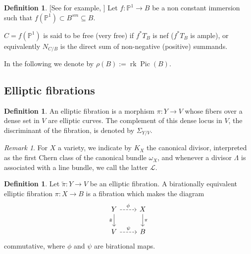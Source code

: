 \documentclass[11pt]{amsart}
\theoremstyle{definition}
\newtheorem{definition}[theorem]{Definition}
\theoremstyle{definition}
\theoremstyle{remark}
\newtheorem{remark}[theorem]{Remark}
\theoremstyle{remark}
\theoremstyle{definition}
\theoremstyle{conjecture}
\def\PP{{\mathbb P}}
\begin{document}
 \begin{definition}\label{def:freeVerFree}[See for example, \cite[Section 2.4]{Debarre2011GAEL}] Let $f: \PP^1\to B$ be a non constant immersion such that $f(\PP^1) \subset B^{sm} \subseteq B$. 
 
 $C=f(\mathbb{P}^1)$  is said to be free (very free) if \( f^*T_B\) is nef (\( f^*T_B \) is ample), or equivalently
$N_{C/B}$ is the direct sum of non-negative (positive) summands.
 
 \end{definition}
In the following we denote by
 $\rho(B):=\operatorname{rk} \operatorname{Pic} (B)$.
\subsection{ Elliptic fibrations }

\begin{definition} An elliptic   fibration is a morphism $\pi : Y\rightarrow V$ whose fibers over a dense set in $V$ are elliptic 
	curves. The complement of this dense locus in $V$, the discriminant of the fibration, is  denoted by  $\Sigma_{Y/V}$.
\end{definition}

\begin{remark}
For $X$ a variety, we indicate by $K_X$ the canonical divisor, interpreted as the first Chern class of the canonical bundle $\omega_X$, and whenever a divisor $\Lambda$ is associated with a  line bundle, we call the latter $\mathcal{L}$.
\end{remark}
\begin{definition}\label{def:bireq} Let  $\tilde \pi : Y \rightarrow V$ be an elliptic fibration. A birationally equivalent elliptic fibration $  \pi :  X  \to B $ is a fibration which makes the diagram 
\[
\begin{tikzcd}
Y \arrow[d, "\tilde \pi "'] \arrow[r, dashed,"\phi"] & X \arrow[d, "\pi"] \\
V \arrow[r, dashed,"\psi" ] & B
\end{tikzcd}
\]
 commutative, where $\phi$   and $\psi$ are birational maps.
\end{definition}
\end{document}
